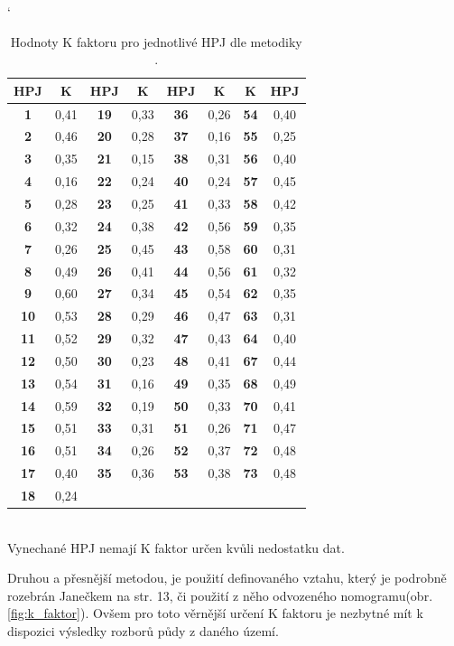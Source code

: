 \begin{table}[hbt]
\begin{center}
\catcode`
    \noindent\begin{tabular}{|*{8}{c|}} \hline \bf HPJ & \bf K & \bf
    HPJ & \bf K & \bf HPJ & \bf K& \bf K & \bf HPJ\\ \hline \bf 1
    &0,41 &\bf 19&0,33 &\bf 36&0,26 &\bf 54&0,40 \\ \hline \bf 2 &0,46
    &\bf 20&0,28 &\bf 37&0,16 &\bf 55&0,25 \\ \hline \bf 3 &0,35 &\bf
    21&0,15 &\bf 38&0,31 &\bf 56&0,40 \\ \hline \bf 4 &0,16 &\bf
    22&0,24 &\bf 40&0,24 &\bf 57&0,45 \\ \hline \bf 5 &0,28 &\bf
    23&0,25 &\bf 41&0,33 &\bf 58&0,42 \\ \hline \bf 6 &0,32 &\bf
    24&0,38 &\bf 42&0,56 &\bf 59&0,35 \\ \hline \bf 7 &0,26 &\bf
    25&0,45 &\bf 43&0,58 &\bf 60&0,31 \\ \hline \bf 8 &0,49 &\bf
    26&0,41 &\bf 44&0,56 &\bf 61&0,32 \\ \hline \bf 9 &0,60 &\bf
    27&0,34 &\bf 45&0,54 &\bf 62&0,35 \\ \hline \bf 10&0,53 &\bf
    28&0,29 &\bf 46&0,47 &\bf 63&0,31 \\ \hline \bf 11&0,52 &\bf
    29&0,32 &\bf 47&0,43 &\bf 64&0,40 \\ \hline \bf 12&0,50 &\bf
    30&0,23 &\bf 48&0,41 &\bf 67&0,44 \\ \hline \bf 13&0,54 &\bf
    31&0,16 &\bf 49&0,35 &\bf 68&0,49 \\ \hline \bf 14&0,59 &\bf
    32&0,19 &\bf 50&0,33 &\bf 70&0,41 \\ \hline \bf 15&0,51 &\bf
    33&0,31 &\bf 51&0,26 &\bf 71&0,47 \\ \hline \bf 16&0,51 &\bf
    34&0,26 &\bf 52&0,37 &\bf 72&0,48 \\ \hline \bf 17&0,40 &\bf
    35&0,36 &\bf 53&0,38 &\bf 73&0,48 \\ \hline \bf 18&0,24 & & & & &
    & \\ \hline
    \end{tabular}\\
    \vspace{10px} Vynechané HPJ nemají K faktor určen kvůli nedostatku
    dat.
  \caption[Hodnoty K faktoru pro jednotlivé HPJ]{Hodnoty K faktoru pro
    jednotlivé HPJ dle metodiky \cite{janecek2012}.}
  \label{hpj_k}
\end{center}
\end{table}
\FloatBarrier Druhou a přesnější metodou, je použití definovaného
vztahu, který je podrobně rozebrán Janečkem\cite{janecek2012} na
str. 13, či použití z něho odvozeného
nomogramu(obr.\ref{fig:k_faktor}). Ovšem pro toto věrnější určení K
faktoru je nezbytné mít k dispozici výsledky rozborů půdy z daného
území.\cite{janecek2012}

